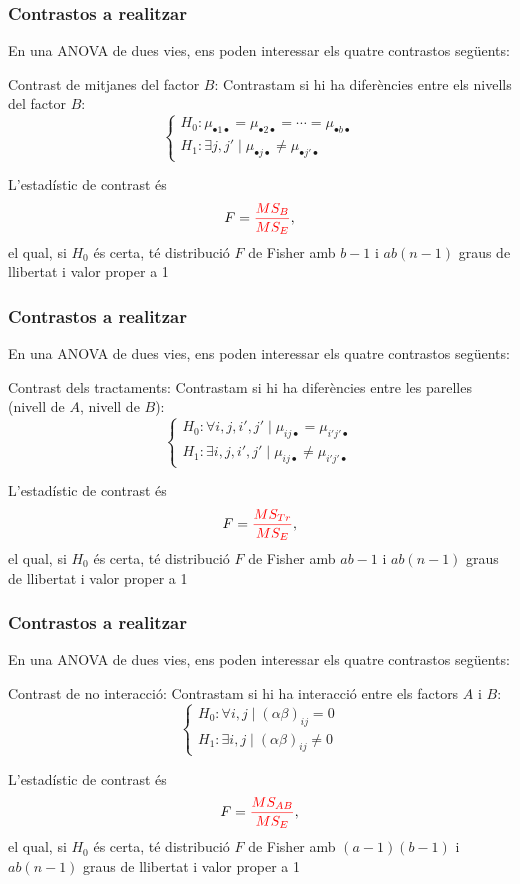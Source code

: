 \documentclass[12pt,t]{beamer}
\newcommand{\red}[1]{\textcolor{red}{#1}}
\renewcommand{\emph}[1]{{\color{red}#1}}
\theoremstyle{plain}
\theoremstyle{definition}
\begin{document}
\begin{frame}
\frametitle{Contrastos a realitzar}

En una ANOVA de dues vies, ens poden interessar 
els quatre contrastos següents:
\bigskip

 \emph{Contrast de mitjanes del factor $B$}: Contrastam si  hi ha diferències entre els nivells del factor $B$:
$$
\left\{
\begin{array}{l}
H_0 : \mu_{\bullet 1\bullet}=\mu_{\bullet 2\bullet}=\cdots =\mu_{ \bullet
b\bullet} \\
H_1 :  \exists j,j'\mid  \mu_{\bullet j\bullet}
\not = \mu_{\bullet j'\bullet}
\end{array}
\right.
$$
\medskip

L'estadístic de contrast és
$$
F=\red{\frac{MS_B}{MS_E}},
$$
el qual, si $H_0$ és certa, té
distribució $F$ de Fisher amb $b-1$ i $ab(n-1)$ graus de llibertat i valor proper a 1

\end{frame}



\begin{frame}
\frametitle{Contrastos a realitzar}

En una ANOVA de dues vies, ens poden interessar 
els quatre contrastos següents:
\bigskip

 \emph{Contrast dels tractaments}: Contrastam si  hi ha diferències entre les parelles (nivell de  $A$, nivell de  $B$):
$$
\left\{
\begin{array}{l}
H_0 : \forall i,j,i',j'\mid \mu_{ij\bullet}=\mu_{i'j'\bullet} \\
H_1 :  \exists i,j,i',j'\mid \mu_{ij\bullet}\neq \mu_{i'j'\bullet}
\end{array}
\right.
$$
\medskip

L'estadístic de contrast és
$$
F=\red{\frac{MS_{Tr}}{MS_E}},
$$
el qual, si $H_0$ és certa, té
distribució $F$ de Fisher amb $ab-1$ i $ab(n-1)$ graus de llibertat i valor proper a 1

\end{frame}

\begin{frame}
\frametitle{Contrastos a realitzar}

En una ANOVA de dues vies, ens poden interessar 
els quatre contrastos següents:
\bigskip

\emph{Contrast de no interacció}: Contrastam si  hi ha interacció entre
els factors $A$ i $B$:
$$
\left\{
\begin{array}{l}
H_0 :  \forall i,j\mid (\alpha\beta)_{ij} =0 \\
H_1 :  \exists i,j\mid (\alpha\beta)_{ij}
\not = 0
\end{array}
\right.
$$
\medskip

L'estadístic de contrast és
$$
F = \red{\frac{MS_{AB}}{MS_E}},
$$
el qual, si $H_0$ és certa, té
distribució $F$ de Fisher amb $(a-1)(b-1)$ i $ab(n-1)$ graus de
llibertat  i valor proper a 1

\end{frame}
\end{document}
